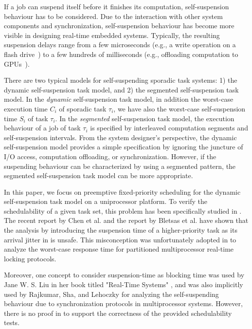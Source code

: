 \documentclass[10pt,conference,preprint]{IEEEtran}
\begin{document}
If a job can suspend itself before it finishes its computation,
self-suspension behaviour has to be considered. Due to the interaction
with other system components and synchronization, self-suspension
behaviour has become more visible in designing real-time embedded
systems.  Typically, the resulting suspension delays range from a few
microseconds (e.g., a write operation on a flash
drive~\cite{Kang:rtss07}) to a few hundreds of milliseconds (e.g.,
offloading computation to GPUs~\cite{Kato_2011,Liu_2014}).

There are two typical models for self-suspending sporadic task
systems: 1) the dynamic self-suspension task model, and 2) the
segmented self-suspension task model. In the \emph{dynamic}
self-suspension task model, in addition the worst-case execution time
$C_i$ of sporadic task $\tau_i$, we have also the worst-case
self-suspension time $S_i$ of task $\tau_i$. In the \emph{segmented} self-suspension
task model, the execution behaviour of a job of task $\tau_i$ is
specified by interleaved computation segments and self-suspension
intervals.  From the system designer's perspective, the dynamic
self-suspension model provides a simple specification by ignoring the
juncture of I/O access, computation offloading, or
synchronization. However, if the suspending behaviour can be
characterized by using a segmented pattern, the segmented
self-suspension task model can be more appropriate.

In this paper, we focus on preemptive fixed-priority scheduling for
the dynamic self-suspension task model on a uniprocessor platform. To
verify the schedulability of a given task set, this problem has been
specifically studied in
\cite{RTCSA-KimCPKH95,MingLiRTCSA1994,ECRTS-AudsleyB04,RTAS-AudsleyB04,huangpass:dac2015}.
The recent report by Chen et al. and the report by Bletsas et
al. \cite{BletsasReport2015} have shown that the analysis by
introducing the suspension time of a higher-priority task as its
arrival jitter in
\cite{ECRTS-AudsleyB04,RTAS-AudsleyB04,RTCSA-KimCPKH95,MingLiRTCSA1994}
is unsafe.  This misconception was unfortunately adopted in
\cite{zeng-2011,bbb-2013,yang-2013,kim-2014,han-2014,carminati-2014,yang-2014,lakshmanan-2009}
to analyze the worst-case response time for partitioned multiprocessor
real-time locking protocols.

Moreover, one concept to consider suspension-time as blocking time was
used by Jane W. S. Liu in her book titled "Real-Time Systems"
\cite[Pages 164-165]{Liu:2000:RS:518501}, and was also implicitly used
by Rajkumar, Sha, and Lehoczky \cite[Page
267]{DBLP:conf/rtss/RajkumarSL88} for analyzing the self-suspending
behaviour due to synchronization protocols in multiprocessor systems.
However, there is no proof in
\cite{Liu:2000:RS:518501,DBLP:conf/rtss/RajkumarSL88} to support the
correctness of the provided schedulability tests.
\end{document}
